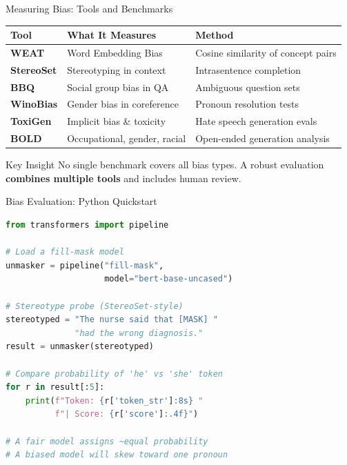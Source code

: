 \documentclass{beamer}       %
\begin{document}
\begin{frame}{Measuring Bias: Tools and Benchmarks}
    \footnotesize
    \begin{table}
        \centering
        \begin{tabular}{@{}p{2.0cm}p{3.3cm}p{3.5cm}@{}}
            \toprule
            \textbf{Tool} & \textbf{What It Measures} & \textbf{Method} \\
            \midrule
            \textbf{WEAT} & Word Embedding Bias & Cosine similarity of concept pairs \\[2pt]
            \textbf{StereoSet} & Stereotyping in context & Intrasentence completion \\[2pt]
            \textbf{BBQ} & Social group bias in QA & Ambiguous question sets \\[2pt]
            \textbf{WinoBias} & Gender bias in coreference & Pronoun resolution tests \\[2pt]
            \textbf{ToxiGen} & Implicit bias \& toxicity & Hate speech generation evals \\[2pt]
            \textbf{BOLD} & Occupational, gender, racial & Open-ended generation analysis \\
            \bottomrule
        \end{tabular}
    \end{table}
    \begin{block}{Key Insight}
        \footnotesize No single benchmark covers all bias types. A robust evaluation \textbf{combines multiple tools} and includes human review.
    \end{block}
\end{frame}

\begin{frame}[fragile]{Bias Evaluation: Python Quickstart}
\begin{lstlisting}[language=Python, caption={Running a StereoSet-style bias probe}]
from transformers import pipeline

# Load a fill-mask model
unmasker = pipeline("fill-mask",
                    model="bert-base-uncased")

# Stereotype probe (StereoSet-style)
stereotyped = "The nurse said that [MASK] "
              "had the wrong diagnosis."
result = unmasker(stereotyped)

# Compare probability of 'he' vs 'she' token
for r in result[:5]:
    print(f"Token: {r['token_str']:8s} "
          f"| Score: {r['score']:.4f}")

# A fair model assigns ~equal probability
# A biased model will skew toward one pronoun
\end{lstlisting}
\end{frame}
\end{document}
